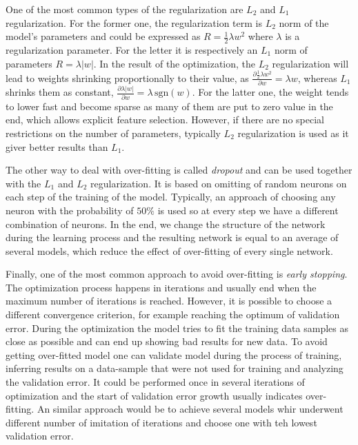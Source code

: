 One of the most common types of the regularization are $L_{2}$ and $L_{1}$ regularization.
For the former one, the regularization term is $L_{2}$ norm of the model's parameters and could be expressed as $R=\frac{1}{2}\lambda w^{2}$ where $\lambda$ is a regularization parameter.
For the letter it is respectively an $L_{1}$ norm of parameters $R=\lambda |w|$.
In the result of the optimization, the $L_{2}$ regularization will lead to weights shrinking proportionally to their value, as $\frac{\partial \frac{1}{2} \lambda w^{2} }{\partial w} = \lambda w$, whereas $L_{1}$ shrinks them as constant, $\frac{\partial \lambda |w| }{\partial w} = \lambda \, \mathrm{sgn}(w) $.
For the latter one, the weight tends to lower fast and become sparse as many of them are put to zero value in the end, which allows explicit feature selection.
However, if there are no special restrictions on the number of parameters, typically $L_{2}$ regularization is used as it giver better results than $L_{1}$.
\medskip

The other way to deal with over-fitting is called \textit{dropout} and can be used together with the $L_{1}$ and $L_{2}$ regularization.
It is based on omitting of random neurons on each step of the training of the model.
Typically, an approach of choosing any neuron with the probability of $50\%$ is used so at every step we have a different combination of neurons.
In the end, we change the structure of the network during the learning process and the resulting network is equal to an average of several models, which reduce the effect of over-fitting of every single network.

Finally, one of the most common approach to avoid over-fitting is \textit{early stopping}.
The optimization process happens in iterations and usually end when the maximum number of iterations is reached.
However, it is possible to choose a different convergence criterion, for example reaching the optimum of validation error.
During the optimization the model tries to fit the training data samples as close as possible and can end up showing bad results for new data.
To avoid getting over-fitted model one can  validate model during the process of training, inferring results on a data-sample that were not used for training and analyzing the validation error.
It could be performed once in several iterations of optimization and the start of validation error growth usually indicates over-fitting.
An similar approach would be to achieve several models  whir underwent different number of imitation of iterations and choose one with teh lowest validation error.



